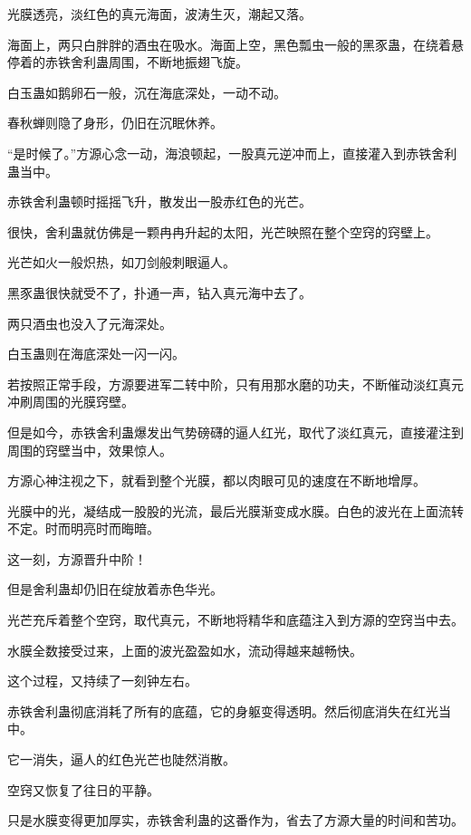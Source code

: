 
\begin{this_body}

光膜透亮，淡红色的真元海面，波涛生灭，潮起又落。

海面上，两只白胖胖的酒虫在吸水。海面上空，黑色瓢虫一般的黑豕蛊，在绕着悬停着的赤铁舍利蛊周围，不断地振翅飞旋。

白玉蛊如鹅卵石一般，沉在海底深处，一动不动。

春秋蝉则隐了身形，仍旧在沉眠休养。

“是时候了。”方源心念一动，海浪顿起，一股真元逆冲而上，直接灌入到赤铁舍利蛊当中。

赤铁舍利蛊顿时摇摇飞升，散发出一股赤红色的光芒。

很快，舍利蛊就仿佛是一颗冉冉升起的太阳，光芒映照在整个空窍的窍壁上。

光芒如火一般炽热，如刀剑般刺眼逼人。

黑豕蛊很快就受不了，扑通一声，钻入真元海中去了。

两只酒虫也没入了元海深处。

白玉蛊则在海底深处一闪一闪。

若按照正常手段，方源要进军二转中阶，只有用那水磨的功夫，不断催动淡红真元冲刷周围的光膜窍壁。

但是如今，赤铁舍利蛊爆发出气势磅礴的逼人红光，取代了淡红真元，直接灌注到周围的窍壁当中，效果惊人。

方源心神注视之下，就看到整个光膜，都以肉眼可见的速度在不断地增厚。

光膜中的光，凝结成一股股的光流，最后光膜渐变成水膜。白色的波光在上面流转不定。时而明亮时而晦暗。

这一刻，方源晋升中阶！

但是舍利蛊却仍旧在绽放着赤色华光。

光芒充斥着整个空窍，取代真元，不断地将精华和底蕴注入到方源的空窍当中去。

水膜全数接受过来，上面的波光盈盈如水，流动得越来越畅快。

这个过程，又持续了一刻钟左右。

赤铁舍利蛊彻底消耗了所有的底蕴，它的身躯变得透明。然后彻底消失在红光当中。

它一消失，逼人的红色光芒也陡然消散。

空窍又恢复了往日的平静。

只是水膜变得更加厚实，赤铁舍利蛊的这番作为，省去了方源大量的时间和苦功。


\end{this_body}
